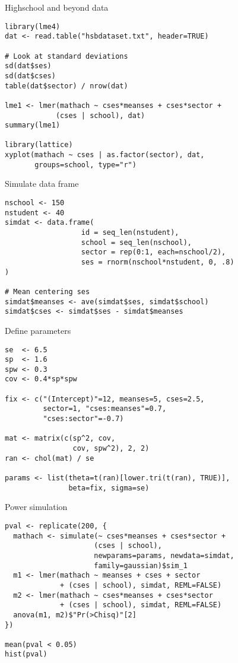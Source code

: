 \documentclass{beamer}
\begin{document}
{

\begin{frame}[fragile]{Highschool and beyond data}
  \begin{lstlisting}
library(lme4)
dat <- read.table("hsbdataset.txt", header=TRUE)

# Look at standard deviations
sd(dat$ses)
sd(dat$cses)
table(dat$sector) / nrow(dat)

lme1 <- lmer(mathach ~ cses*meanses + cses*sector + 
            (cses | school), dat)
summary(lme1)

library(lattice)
xyplot(mathach ~ cses | as.factor(sector), dat, 
       groups=school, type="r")
  \end{lstlisting}
\end{frame}


\begin{frame}[fragile]{Simulate data frame}
  \begin{lstlisting}
nschool <- 150
nstudent <- 40
simdat <- data.frame( 
                  id = seq_len(nstudent),
                  school = seq_len(nschool),
                  sector = rep(0:1, each=nschool/2),
                  ses = rnorm(nschool*nstudent, 0, .8)
)

# Mean centering ses
simdat$meanses <- ave(simdat$ses, simdat$school)
simdat$cses <- simdat$ses - simdat$meanses
  \end{lstlisting}
\end{frame}

\begin{frame}[fragile]{Define parameters}
  \begin{lstlisting}
se  <- 6.5
sp  <- 1.6
spw <- 0.3
cov <- 0.4*sp*spw

fix <- c("(Intercept)"=12, meanses=5, cses=2.5, 
         sector=1, "cses:meanses"=0.7, 
         "cses:sector"=-0.7)

mat <- matrix(c(sp^2, cov,
                cov, spw^2), 2, 2)
ran <- chol(mat) / se

params <- list(theta=t(ran)[lower.tri(t(ran), TRUE)],
               beta=fix, sigma=se)
  \end{lstlisting}
\end{frame}


\begin{frame}[fragile]{Power simulation}
  \begin{lstlisting}
pval <- replicate(200, {
  mathach <- simulate(~ cses*meanses + cses*sector + 
                     (cses | school),
                     newparams=params, newdata=simdat,
                     family=gaussian)$sim_1
  m1 <- lmer(mathach ~ meanses + cses + sector
             + (cses | school), simdat, REML=FALSE)
  m2 <- lmer(mathach ~ cses*meanses + cses*sector
             + (cses | school), simdat, REML=FALSE)
  anova(m1, m2)$"Pr(>Chisq)"[2]
})

mean(pval < 0.05)
hist(pval)
  \end{lstlisting}
\end{frame}

}
\end{document}
